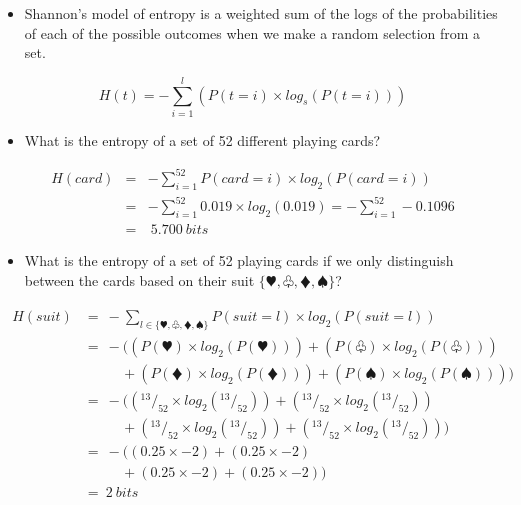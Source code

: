 \documentclass[xcolor={table}]{beamer}
\begin{document}
 \begin{frame} 
 \begin{itemize}
 	\item Shannon's model of entropy is a weighted sum of the logs of the probabilities of each of the possible outcomes when we make a random selection from a set.
\end{itemize}
\begin{equation}
H(t) = - \sum_{i=1}^l \left( P(t=i)\times log_s(P(t=i)) \right)
\label{eq:shannon}
\end{equation}
\end{frame} 

 \begin{frame} 
 \begin{itemize}
 	\item What is the entropy of a set of 52 different playing cards?
\end{itemize}
\begin{eqnarray*}
H(card) & = & - \sum_{i=1}^{52} P(card=i) \times log_2(P(card=i))\\
& = &  - \sum_{i=1}^{52} 0.019 \times log_2(0.019)  = - \sum_{i=1}^{52} -0.1096 \\
& = & ~ 5.700 ~ bits
\end{eqnarray*}
\end{frame} 

 \begin{frame} 
 \begin{itemize}
 	\item What is the entropy of a set of 52 playing cards if we only distinguish between the cards based on their suit $\{\varheart, \varclub, \vardiamond, \spadesuit\}$?
\end{itemize}
\end{frame}

 \begin{frame} 
\begin{eqnarray*}
	\begin{alignedat}{2}
H(suit) & =~- \sum_{l \in \{\varheart, \varclub, \vardiamond, \spadesuit\} } P(suit=l) \times log_2(P(suit=l)) \\
& =~- \big(\left( P(\varheart) \times log_2(P(\varheart)) \right) + \left( P(\varclub) \times log_2(P(\varclub)) \right) \\
  & ~~~~~~~~~~~~ + \left( P(\vardiamond) \times log_2(P(\vardiamond)) \right)  + \left( P(\spadesuit) \times log_2(P(\spadesuit)) \right)\big)\\
& =~- \big(\left(^{13}/_{52} \times log_2( ^{13}/_{52}) \right)  + \left( ^{13}/_{52} \times log_2( ^{13}/_{52} ) \right)\\
  & ~~~~~~~~~~~~ + \left(^{13}/_{52} \times log_2( ^{13}/_{52}) \right)  + \left(^{13}/_{52} \times log_2( ^{13}/_{52} ) \right)\big)\\
& =~- \big(\left(0.25 \times -2 \right)  + \left(0.25 \times -2 \right) \\
& ~~~~~~~~~~~~ + \left(0.25 \times -2 \right)  + \left(0.25 \times -2 \right)\big)\\
& =~ 2~ bits
	\end{alignedat}
\end{eqnarray*}
\end{frame} 
\end{document}
